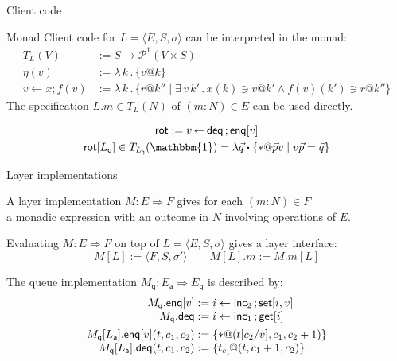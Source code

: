 \documentclass[aspectratio=141]{beamer}
\newcommand{\kw}[1]{\ensuremath{ \mathsf{#1} }}
\newcommand{\bdot}{\boldsymbol{\cdot}}
\begin{document}
\begin{frame}{Client code} %
  \begin{block}{Monad}
    Client code for $L = \langle E, S, \sigma \rangle$
    can be interpreted in the monad:
    \begin{align*}
      T_L(V) &:= S \rightarrow \mathcal{P}^1(V \times S) \\
      \eta(v) &:= \lambda \, k \,.\, \{ v@k \} \\
      v \mathop{\leftarrow} x \mathop{;} f(v) &:=
        \lambda \, k \,.\, \{ r@k'' \mid
        \exists \, v \, k' \,.\, x(k) \ni v@k' \wedge f(v)(k') \ni r@k'' \}
    \end{align*}
    The specification $L.m \in T_L(N)$ of $(m : N) \in E$
    can be used directly.
  \end{block}
  \pause
  \begin{example}
    \vspace{-\baselineskip}
    \begin{gather*}
      \kw{rot} :=
      v \mathop{\leftarrow} \kw{deq} \mathop{;} \kw{enq}[v] \\
      \kw{rot}[L_\kw{q}] \in T_{L_\kw{q}}(\mathbbm{1}) =
      \lambda \vec{q} \bdot \{ *@\vec{p}v \mid v\vec{p} = \vec{q} \}
    \end{gather*}
  \end{example}
\end{frame}

\begin{frame}{Layer implementations} %
  \begin{definition}
    A layer implementation $M : E \Rightarrow F$
    gives for each $(m : N) \in F$ \\
    a monadic expression with an outcome in $N$
    involving operations of $E$.

    Evaluating $M : E \Rightarrow F$ on top of
    $L = \langle E, S, \sigma \rangle$ gives a layer interface:
    \[
        M[L] := \langle F, S, \sigma' \rangle
        \qquad
        M[L].m := M.m[L]
    \]
  \end{definition}
  \pause
  \begin{example}
    The queue implementation
    $M_\kw{q} : E_\kw{a} \Rightarrow E_\kw{q}$ is described by:
    \[
      \begin{array}{r@{}l}
        M_\kw{q}.\kw{enq}[v] & {} :=
          i \leftarrow \kw{inc}_2 \mathop{;} \kw{set}[i, v] \\
        M_\kw{q}.\kw{deq} & {} :=
          i \leftarrow \kw{inc}_1 \mathop{;} \kw{get}[i]
        \\[1ex]
        M_\kw{q}[L_\kw{a}].\kw{enq}[v](t, c_1, c_2) & {} :=
          \{ * @ (t[c_2/v], c_1, c_2+1) \} \\
        M_\kw{q}[L_\kw{a}].\kw{deq}(t, c_1, c_2) & {} :=
          \{ t_{c_1} \! @ (t, c_1+1, c_2) \}
      \end{array}
    \]
  \end{example}
\end{frame}
\end{document}
